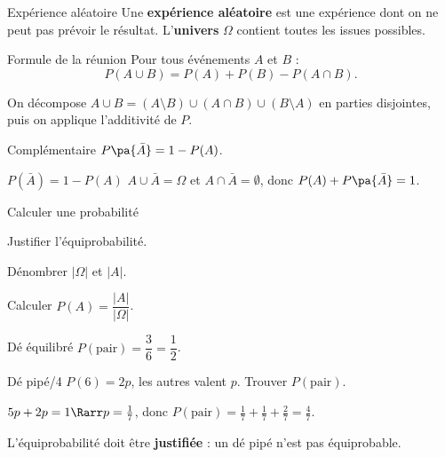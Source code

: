 \begin{defin}{Expérience aléatoire}
	Une \textbf{expérience aléatoire} est une expérience dont on ne peut pas
	prévoir le résultat. L'\textbf{univers} $\Omega$ contient toutes les
	issues possibles.
\end{defin}

\begin{theo}{Formule de la réunion}
	Pour tous événements $A$ et $B$ :
	\[
		P(A \cup B) = P(A) + P(B) - P(A \cap B).
	\]
\end{theo}

\begin{demo}{}
	On décompose $A\cup B = (A\setminus B)\cup(A\cap B)\cup(B\setminus A)$
	en parties disjointes, puis on applique l'additivité de $P$.
\end{demo}

\begin{prop}{Complémentaire}
	$P\pa{\bar{A}} = 1 - P(A)$.
\end{prop}

\begin{preuve}{$P(\bar A) = 1-P(A)$}
	$A\cup\bar{A}=\Omega$ et $A\cap\bar{A}=\emptyset$, donc
	$P(A)+P\pa{\bar{A}}=1$.
\end{preuve}

\begin{methode}{Calculer une probabilité}
	\be
	\item Justifier l'équiprobabilité.
	\item Dénombrer $|\Omega|$ et $|A|$.
	\item Calculer $P(A)=\dfrac{|A|}{|\Omega|}$.
	\ee
\end{methode}

\begin{ex}{Dé équilibré}
	$P(\text{pair}) = \dfrac{3}{6} = \dfrac{1}{2}$.
\end{ex}

\begin{exercice}{Dé pipé\hfill /4}
	$P(\text{6})=2p$, les autres valent $p$. Trouver $P(\text{pair})$.
\end{exercice}

\begin{correction}
	$5p+2p=1 \Rarr p=\frac{1}{7}$, donc
	$P(\text{pair})=\frac{1}{7}+\frac{1}{7}+\frac{2}{7}=\frac{4}{7}$.
\end{correction}

\begin{attention}
	L'équiprobabilité doit être \textbf{justifiée} : un dé pipé n'est pas
	équiprobable.
\end{attention}

